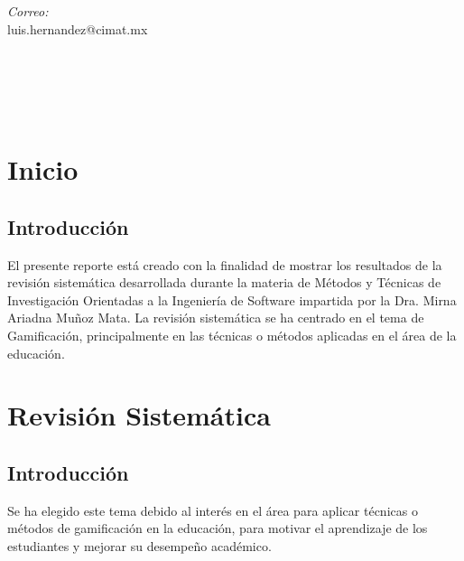 \documentclass{report}
\makeatletter
\let\thedate\@date
\makeatother
\begin{document}
\begin{titlepage}
	\begin{minipage}{0.5\textwidth}
		\begin{flushleft} \large
			\emph{Correo:}\\
			luis.hernandez@cimat.mx
		\end{flushleft}
	\end{minipage}~
	\begin{minipage}{0.4\textwidth}
		\begin{flushright} \large
		\end{flushright}
	\end{minipage}\\[2 cm]
		
	{\large \thedate}\\[2 cm]
 
	\vfill
	
\end{titlepage}


\tableofcontents
\pagebreak

\chapter{Inicio}
    
    \section{Introducción}
    El presente reporte está creado con la finalidad de mostrar los resultados de la revisión sistemática desarrollada durante la materia de Métodos y Técnicas de Investigación Orientadas a la Ingeniería de Software impartida por la Dra. Mirna Ariadna Muñoz Mata. La revisión sistemática se ha centrado en el tema de Gamificación, principalmente en las técnicas o métodos aplicadas en el área de la educación.\\
    
\chapter{Revisión Sistemática}

    \section{Introducción}
    Se ha elegido este tema debido al interés en el área para aplicar técnicas o métodos de gamificación en la educación, para motivar el aprendizaje de los estudiantes y mejorar su desempeño académico.\\
\end{document}

